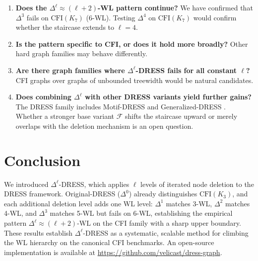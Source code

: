 \documentclass[11pt,a4paper]{article}
\begin{document}
\begin{enumerate}
    \item \textbf{Does the $\Delta^\ell \approx (\ell+2)$-WL pattern continue?} We have confirmed that $\Delta^3$ fails on $\text{CFI}(K_7)$ (6-WL). Testing $\Delta^4$ on $\text{CFI}(K_7)$ would confirm whether the staircase extends to $\ell = 4$.

    \item \textbf{Is the pattern specific to CFI, or does it hold more broadly?} Other hard graph families may behave differently.

    \item \textbf{Are there graph families where $\Delta^\ell$-DRESS fails for all constant $\ell$?} CFI graphs over graphs of unbounded treewidth would be natural candidates.

    \item \textbf{Does combining $\Delta^\ell$ with other DRESS variants yield further gains?} The DRESS family includes Motif-DRESS and Generalized-DRESS \cite{castrillo2026dress}. Whether a stronger base variant $\mathcal{F}$ shifts the staircase upward or merely overlaps with the deletion mechanism is an open question.
\end{enumerate}

\section{Conclusion}

We introduced $\Delta^\ell$-DRESS, which applies $\ell$ levels of iterated node deletion to the DRESS framework. Original-DRESS ($\Delta^0$) already distinguishes $\text{CFI}(K_3)$, and each additional deletion level adds one WL level: $\Delta^1$ matches 3-WL, $\Delta^2$ matches 4-WL, and $\Delta^3$ matches 5-WL but fails on 6-WL, establishing the empirical pattern $\Delta^\ell \approx (\ell+2)$-WL on the CFI family with a sharp upper boundary. These results establish $\Delta^\ell$-DRESS as a systematic, scalable method for climbing the WL hierarchy on the canonical CFI benchmarks. An open-source implementation is available at \url{https://github.com/velicast/dress-graph}.



\end{document}
